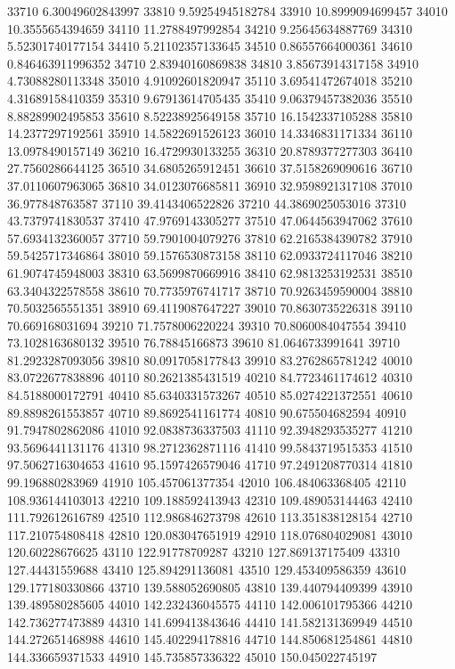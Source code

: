 {33710 6.30049602843997
33810 9.59254945182784
33910 10.8999094699457
34010 10.3555654394659
34110 11.2788497992854
34210 9.25645634887769
34310 5.52301740177154
34410 5.21102357133645
34510 0.86557664000361
34610 0.846463911996352
34710 2.83940160869838
34810 3.85673914317158
34910 4.73088280113348
35010 4.91092601820947
35110 3.69541472674018
35210 4.31689158410359
35310 9.67913614705435
35410 9.06379457382036
35510 8.88289902495853
35610 8.52238925649158
35710 16.1542337105288
35810 14.2377297192561
35910 14.5822691526123
36010 14.3346831171334
36110 13.0978490157149
36210 16.4729930133255
36310 20.8789377277303
36410 27.7560286644125
36510 34.6805265912451
36610 37.5158269090616
36710 37.0110607963065
36810 34.0123076685811
36910 32.9598921317108
37010 36.977848763587
37110 39.4143406522826
37210 44.3869025053016
37310 43.7379741830537
37410 47.9769143305277
37510 47.0644563947062
37610 57.6934132360057
37710 59.7901004079276
37810 62.2165384390782
37910 59.5425717346864
38010 59.1576530873158
38110 62.0933724117046
38210 61.9074745948003
38310 63.5699870669916
38410 62.9813253192531
38510 63.3404322578558
38610 70.7735976741717
38710 70.9263459590004
38810 70.5032565551351
38910 69.4119087647227
39010 70.8630735226318
39110 70.669168031694
39210 71.7578006220224
39310 70.8060084047554
39410 73.1028163680132
39510 76.78845166873
39610 81.0646733991641
39710 81.2923287093056
39810 80.0917058177843
39910 83.2762865781242
40010 83.0722677838896
40110 80.2621385431519
40210 84.7723461174612
40310 84.5188000172791
40410 85.6340331573267
40510 85.0274221372551
40610 89.8898261553857
40710 89.8692541161774
40810 90.675504682594
40910 91.7947802862086
41010 92.0838736337503
41110 92.3948293535277
41210 93.5696441131176
41310 98.2712362871116
41410 99.5843719515353
41510 97.5062716304653
41610 95.1597426579046
41710 97.2491208770314
41810 99.196880283969
41910 105.457061377354
42010 106.484063368405
42110 108.936144103013
42210 109.188592413943
42310 109.489053144463
42410 111.792612616789
42510 112.986846273798
42610 113.351838128154
42710 117.210754808418
42810 120.083047651919
42910 118.076804029081
43010 120.60228676625
43110 122.91778709287
43210 127.869137175409
43310 127.44431559688
43410 125.894291136081
43510 129.453409586359
43610 129.177180330866
43710 139.588052690805
43810 139.440794409399
43910 139.489580285605
44010 142.232436045575
44110 142.006101795366
44210 142.736277473889
44310 141.699413843646
44410 141.582131369949
44510 144.272651468988
44610 145.402294178816
44710 144.850681254861
44810 144.336659371533
44910 145.735857336322
45010 150.045022745197
}
